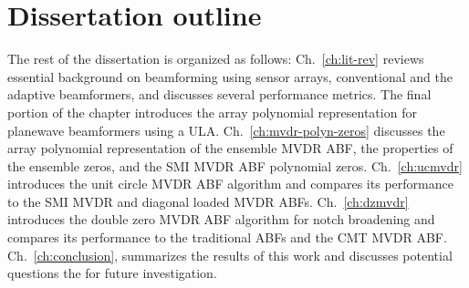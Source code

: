 \section{Dissertation outline}
\label{sec:outline}
The rest of the dissertation is organized as follows:
Ch.~\ref{ch:lit-rev} reviews essential background on beamforming using
sensor arrays, conventional and the adaptive beamformers, and
discusses several performance metrics. The final portion of the
chapter introduces the array polynomial representation for planewave
beamformers using a ULA. Ch.~\ref{ch:mvdr-polyn-zeros} discusses the
array polynomial representation of the ensemble MVDR ABF, the
properties of the ensemble zeros, and the SMI MVDR ABF polynomial
zeros. Ch.~\ref{ch:ucmvdr} introduces the unit circle MVDR ABF
algorithm and compares its performance to the SMI MVDR and diagonal
loaded MVDR ABFs. Ch.~\ref{ch:dzmvdr} introduces the double zero MVDR
ABF algorithm for notch broadening and compares its performance to the
traditional ABFs and the CMT MVDR ABF. Ch.~\ref{ch:conclusion},
summarizes the results of this work and discusses potential questions
the for future investigation.
	

